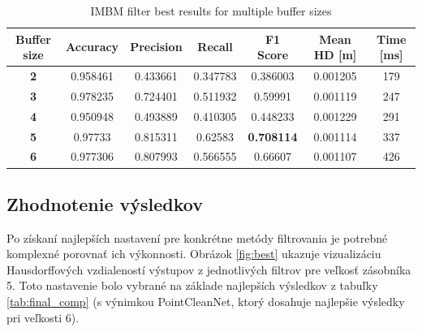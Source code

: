 \begin{table}[h]
	\caption{\label{tab:imbm_best} IMBM filter best results for multiple buffer sizes }
	\centering
	\begin{tabular}{ccccccc}
		\toprule
		\textbf{Buffer size} & \textbf{Accuracy} & \textbf{Precision} & \textbf{Recall} & \textbf{F1 Score} & \textbf{Mean HD [m]} & \textbf{Time [ms]} \\ 
		\midrule
		\textbf{2}           & 0.958461          & 0.433661           & 0.347783        & 0.386003          & 0.001205          & 179           \\ 
		\textbf{3}           & 0.978235          & 0.724401           & 0.511932        & 0.59991           & 0.001119          & 247           \\ 
		\textbf{4}           & 0.950948          & 0.493889           & 0.410305        & 0.448233          & 0.001229          & 291           \\ 
		\textbf{5}           & 0.97733           & 0.815311           & 0.62583         & \textbf{0.708114}          & 0.001114 & 337           \\ 
		\textbf{6}           & 0.977306          & 0.807993           & 0.566555        & 0.66607           & 0.001107          & 426           \\ 
		\bottomrule
	\end{tabular}
\end{table}

\subsection{Zhodnotenie výsledkov}

Po získaní najlepších nastavení pre konkrétne metódy filtrovania je potrebné komplexné porovnať ich výkonnosti. Obrázok \ref{fig:best} ukazuje vizualizáciu Hausdorffových vzdialeností výstupov z jednotlivých filtrov pre veľkosť zásobníka 5. Toto nastavenie bolo vybrané na základe najlepších výsledkov z tabuľky \ref {tab:final_comp} (s výnimkou PointCleanNet, ktorý dosahuje najlepšie výsledky pri veľkosti 6).


